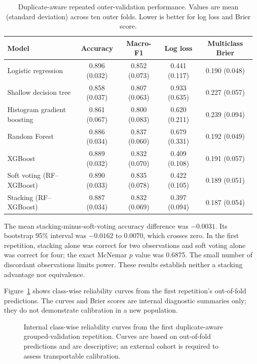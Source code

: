 \begin{table}[width=\textwidth,pos=!tbp]
\centering
\caption{Duplicate-aware repeated outer-validation performance. Values are mean (standard deviation) across ten outer folds. Lower is better for log loss and Brier score.}
\label{tab:performance-revision}
\small
\begin{tabularx}{\textwidth}{@{}Y c c c c@{}}
\toprule
Model & Accuracy & Macro-F1 & Log loss & Multiclass Brier \\
\midrule
Logistic regression & 0.896 (0.032) & 0.852 (0.073) & 0.441 (0.117) & 0.190 (0.048) \\
Shallow decision tree & 0.858 (0.037) & 0.807 (0.063) & 0.933 (0.635) & 0.227 (0.057) \\
Histogram gradient boosting & 0.861 (0.067) & 0.800 (0.083) & 0.620 (0.211) & 0.239 (0.094) \\
Random Forest & 0.886 (0.034) & 0.837 (0.060) & 0.679 (0.331) & 0.192 (0.049) \\
XGBoost & 0.889 (0.032) & 0.832 (0.070) & 0.409 (0.108) & 0.191 (0.057) \\
Soft voting (RF--XGBoost) & 0.890 (0.033) & 0.835 (0.078) & 0.422 (0.105) & 0.189 (0.051) \\
Stacking (RF--XGBoost) & 0.887 (0.034) & 0.832 (0.069) & 0.397 (0.094) & 0.187 (0.054) \\
\bottomrule
\end{tabularx}
\end{table}

The mean stacking-minus-soft-voting accuracy difference was $-0.0031$. Its bootstrap 95\% interval was $-0.0162$ to $0.0070$, which crosses zero. In the first repetition, stacking alone was correct for two observations and soft voting alone was correct for four; the exact McNemar $p$ value was 0.6875. The small number of discordant observations limits power. These results establish neither a stacking advantage nor equivalence.

Figure~\ref{fig:calibration-revision} shows class-wise reliability curves from the first repetition's out-of-fold predictions. The curves and Brier scores are internal diagnostic summaries only; they do not demonstrate calibration in a new population.

\begin{figure}[width=\textwidth,pos=!tbp,align=\centering]
\centering
{}
\caption{Internal class-wise reliability curves from the first duplicate-aware grouped-validation repetition. Curves are based on out-of-fold predictions and are descriptive; an external cohort is required to assess transportable calibration.}
\label{fig:calibration-revision}
\end{figure}

